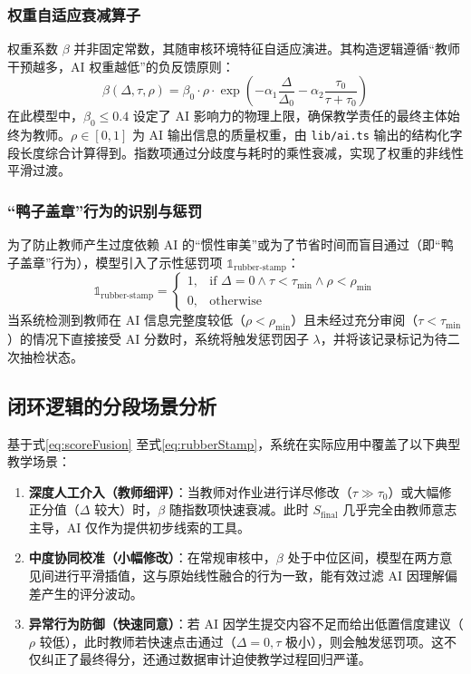 \documentclass[12pt,a4paper,oneside]{ctexbook}
\numberwithin{equation}{chapter}
\begin{document}
\subsubsection{权重自适应衰减算子}
权重系数 $\beta$ 并非固定常数，其随审核环境特征自适应演进。其构造逻辑遵循“教师干预越多，AI 权重越低”的负反馈原则：
\begin{equation}
\beta(\Delta, \tau, \rho) = \beta_0 \cdot \rho \cdot \exp\left( -\alpha_1 \frac{\Delta}{\Delta_0} - \alpha_2 \frac{\tau_0}{\tau + \tau_0} \right)
\label{eq:scoreFusionBeta}
\end{equation}
在此模型中，$\beta_0 \le 0.4$ 设定了 AI 影响力的物理上限，确保教学责任的最终主体始终为教师。$\rho \in [0,1]$ 为 AI 输出信息的质量权重，由 \texttt{lib/ai.ts} 输出的结构化字段长度综合计算得到。指数项通过分歧度与耗时的乘性衰减，实现了权重的非线性平滑过渡。

\subsubsection{“鸭子盖章”行为的识别与惩罚}
为了防止教师产生过度依赖 AI 的“惯性审美”或为了节省时间而盲目通过（即“鸭子盖章”行为），模型引入了示性惩罚项 $\mathbb{1}_{\text{rubber-stamp}}$：
\begin{equation}
\mathbb{1}_{\text{rubber-stamp}} = 
\begin{cases} 
1, & \text{if } \Delta=0 \land \tau < \tau_{\min} \land \rho < \rho_{\min} \\ 
0, & \text{otherwise} 
\end{cases}
\label{eq:rubberStamp}
\end{equation}
当系统检测到教师在 AI 信息完整度较低（$\rho < \rho_{\min}$）且未经过充分审阅（$\tau < \tau_{\min}$）的情况下直接接受 AI 分数时，系统将触发惩罚因子 $\lambda$，并将该记录标记为待二次抽检状态。

\subsection{闭环逻辑的分段场景分析}
基于式\eqref{eq:scoreFusion} 至式\eqref{eq:rubberStamp}，系统在实际应用中覆盖了以下典型教学场景：
\begin{enumerate}[label=(\arabic*)]
    \item \textbf{深度人工介入（教师细评）}：当教师对作业进行详尽修改（$\tau \gg \tau_0$）或大幅修正分值（$\Delta$ 较大）时，$\beta$ 随指数项快速衰减。此时 $S_{\text{final}}$ 几乎完全由教师意志主导，AI 仅作为提供初步线索的工具。
    \item \textbf{中度协同校准（小幅修改）}：在常规审核中，$\beta$ 处于中位区间，模型在两方意见间进行平滑插值，这与原始线性融合的行为一致，能有效过滤 AI 因理解偏差产生的评分波动。
    \item \textbf{异常行为防御（快速同意）}：若 AI 因学生提交内容不足而给出低置信度建议（$\rho$ 较低），此时教师若快速点击通过（$\Delta=0, \tau$ 极小），则会触发惩罚项。这不仅纠正了最终得分，还通过数据审计迫使教学过程回归严谨。
\end{enumerate}
\end{document}
